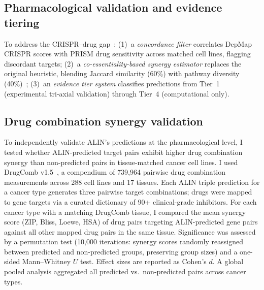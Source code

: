 \documentclass[times, twoside, watermark]{zHenriquesLab-StyleBioRxiv}
\begin{document}
\subsection*{Pharmacological validation and evidence tiering}
To address the CRISPR--drug gap~\cite{Lin2017,Goncalves2020}: (1)~a \emph{concordance filter} correlates DepMap CRISPR scores with PRISM drug sensitivity across matched cell lines, flagging discordant targets; (2)~a \emph{co-essentiality-based synergy estimator} replaces the original heuristic, blending Jaccard similarity (60\%) with pathway diversity (40\%)~\cite{Norman2019,Shen2017combCRISPR}; (3)~an \emph{evidence tier system} classifies predictions from Tier~1 (experimental tri-axial validation) through Tier~4 (computational only).

\subsection*{Drug combination synergy validation}
To independently validate ALIN's predictions at the pharmacological level, I tested whether ALIN-predicted target pairs exhibit higher drug combination synergy than non-predicted pairs in tissue-matched cancer cell lines. I used DrugComb v1.5~\cite{Zagidullin2019,Zheng2022}, a compendium of 739{,}964 pairwise drug combination measurements across 288 cell lines and 17 tissues. Each ALIN triple prediction for a cancer type generates three pairwise target combinations; drugs were mapped to gene targets via a curated dictionary of 90+ clinical-grade inhibitors. For each cancer type with a matching DrugComb tissue, I compared the mean synergy score (ZIP, Bliss, Loewe, HSA) of drug pairs targeting ALIN-predicted gene pairs against all other mapped drug pairs in the same tissue. Significance was assessed by a permutation test (10{,}000 iterations: synergy scores randomly reassigned between predicted and non-predicted groups, preserving group sizes) and a one-sided Mann--Whitney $U$ test. Effect sizes are reported as Cohen's $d$. A global pooled analysis aggregated all predicted vs.\ non-predicted pairs across cancer types.
\end{document}
